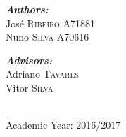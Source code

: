\documentclass[
11pt, %
a4paper,
english,
onehalfspacing, %
]{article}
\begin{document}
\begin{titlepage}
\begin{center}
		
		
		\begin{minipage}[t]{0.4\textwidth}
			\begin{flushleft} \large
				\emph{\textbf{Authors:}}\\ {José \textsc{Ribeiro} A71881 \\Nuno \textsc{Silva} A70616} 
			\end{flushleft}
		\end{minipage}
		\begin{minipage}[t]{0.4\textwidth}
			\begin{flushright} \large
				\emph{\textbf{Advisors:}} \\{Adriano \textsc{Tavares} \\Vitor \textsc{Silva}} %
			\end{flushright}
		\end{minipage}\\[2.5cm]
		
		
		{\large Academic Year: 2016/2017}
		
		\vfill
	\end{center}
\end{titlepage}

\newpage
{}  %

\tableofcontents %

\newpage
\listoffigures %

\newpage
\listoftables %


\newpage


\end{document}
